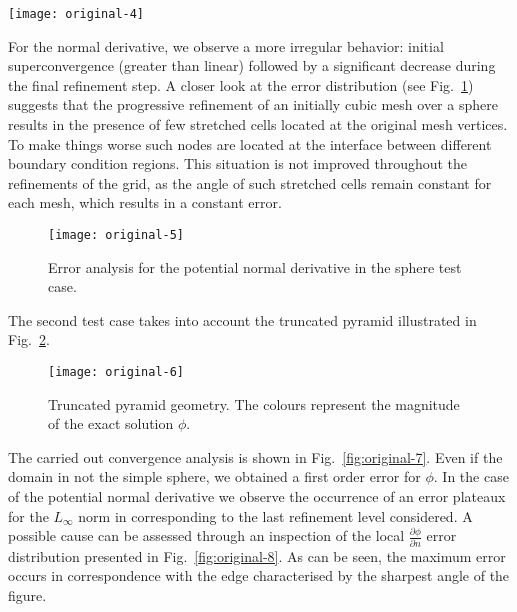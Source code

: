 \begin{figure*}[htp]
\begin{center}
    \texttt{[image: original-4]}    %
    \caption{Convergence analysis for the error in a mixed Dirichlet-Neumann problem using $Q_1$ boundary elements and the spherical mesh. On the left we plot the analysis for the variable $\phi$, on the right we depict the errors for $\frac{\partial\phi}{\partial n}$.} 
    \label{fig:original-4}
\end{center}
\end{figure*}

\newpage

For the normal derivative, we observe a more irregular behavior: initial superconvergence (greater than linear) followed by a significant decrease during the final refinement step. A closer look at the error distribution (see Fig.~\ref{fig:original-5}) suggests that the progressive refinement of an initially cubic mesh over a sphere results in the presence of few stretched cells located at the original mesh vertices. To make things worse such nodes are located at the interface between different boundary condition regions. This situation is not improved throughout the refinements of the grid, as the angle of such stretched cells remain constant for each mesh, which results in a constant error.

\begin{figure}[htp]
\begin{center}
    \texttt{[image: original-5]}    %
    \caption{Error analysis for the potential normal derivative in the sphere test case.} 
    \label{fig:original-5}
\end{center}
\end{figure}

The second test case takes into account the truncated pyramid illustrated in Fig.~\ref{fig:original-6}.

\begin{figure}[htp]
\begin{center}
    \texttt{[image: original-6]}    %
    \caption{Truncated pyramid geometry. The colours represent the magnitude of the exact solution $\phi$.} 
    \label{fig:original-6}
\end{center}
\end{figure}

The carried out convergence analysis is shown in Fig.~\ref{fig:original-7}. Even if the domain in not the simple sphere, we obtained a first order error for $\phi$. In the case of the potential normal derivative we observe the occurrence of an error plateaux for the $L_\infty$
norm in corresponding to the last refinement level considered. A possible cause can be assessed through an inspection of the local $\frac{\partial\phi}{\partial n}$ error distribution presented in Fig.~\ref{fig:original-8}. As can be seen, the maximum error occurs in correspondence with the edge characterised by the sharpest angle of the figure.

